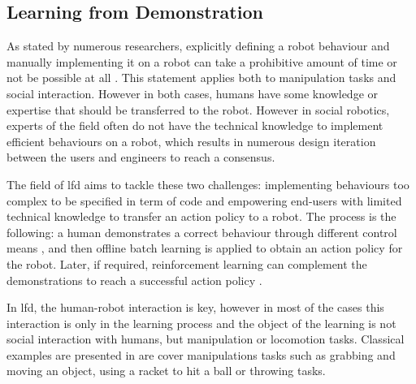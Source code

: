 \subsection{Learning from Demonstration} \label{ssec:back_lfd}
	As stated by numerous researchers, explicitly defining a robot behaviour and manually implementing it on a robot can take a prohibitive amount of time or not be possible at all \citep{argall2009survey,billard2008robot}. This statement applies both to manipulation tasks and social interaction. However in both cases, humans have some knowledge or expertise that should be transferred to the robot. However in social robotics, experts of the field often do not have the technical knowledge to implement efficient behaviours on a robot, which results in numerous design iteration between the users and engineers to reach a consensus. 
	
	    
	The field of \gls{lfd} aims to tackle these two challenges: implementing behaviours too complex to be specified in term of code and empowering end-users with limited technical knowledge to transfer an action policy to a robot. The process is the following: a human demonstrates a correct behaviour through different control means \citep{argall2009survey}, and then offline batch learning is applied to obtain an action policy for the robot. Later, if required, reinforcement learning can complement the demonstrations to reach a successful action policy \citep{billard2008robot}.
	
	In \gls{lfd}, the human-robot interaction is key, however in most of the cases this interaction is only in the learning process and the object of the learning is not social interaction with humans, but manipulation or locomotion tasks. Classical examples are presented in \cite{billard2008robot} are cover manipulations tasks such as grabbing and moving an object, using a racket to hit a ball or throwing tasks.
	
